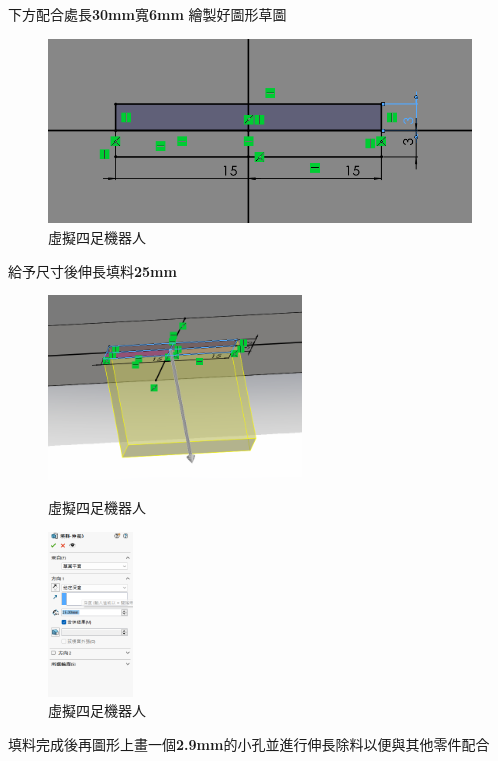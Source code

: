 \noindent 下方配合處長\textbf{30mm}寬\textbf{6mm} 繪製好圖形草圖

\begin{figure}[h!]
    \centering
    \includegraphics[width=1\textwidth]{./../images/6-1-15.png}
    \caption{\Large 虛擬四足機器人}
\end{figure}

\noindent 給予尺寸後伸長填料\textbf{25mm}

\begin{figure}[h!]
    \centering
    \includegraphics[width=0.6\textwidth]{./../images/6-1-16.png}
    \caption{\Large 虛擬四足機器人}
    \includegraphics[width=0.2\textwidth]{./../images/6-1-17.png}
    \caption{\Large 虛擬四足機器人}
\end{figure}

\noindent 填料完成後再圖形上畫一個\textbf{2.9mm}的小孔並進行伸長除料以便與其他零件配合

